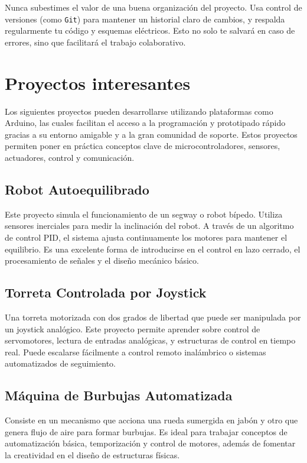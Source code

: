 \documentclass[a4paper,11pt]{article}
\begin{document}
\begin{tcolorbox}[tip,title=Consejo]
 Nunca subestimes el valor de una buena organización del proyecto. Usa control de versiones (como \texttt{Git}) para mantener un historial claro de cambios, y respalda regularmente tu código y esquemas eléctricos. Esto no solo te salvará en caso de errores, sino que facilitará el trabajo colaborativo.
\end{tcolorbox}



\section{Proyectos interesantes}
Los siguientes proyectos pueden desarrollarse utilizando plataformas como Arduino, las cuales facilitan el acceso a la programación y prototipado rápido gracias a su entorno amigable y a la gran comunidad de soporte. Estos proyectos permiten poner en práctica conceptos clave de microcontroladores, sensores, actuadores, control y comunicación.

\subsection{Robot Autoequilibrado}
Este proyecto simula el funcionamiento de un segway o robot bípedo. Utiliza sensores inerciales para medir la inclinación del robot. A través de un algoritmo de control PID, el sistema ajusta continuamente los motores para mantener el equilibrio. Es una excelente forma de introducirse en el control en lazo cerrado, el procesamiento de señales y el diseño mecánico básico.

\subsection{Torreta Controlada por Joystick}
Una torreta motorizada con dos grados de libertad que puede ser manipulada por un joystick analógico. Este proyecto permite aprender sobre control de servomotores, lectura de entradas analógicas, y estructuras de control en tiempo real. Puede escalarse fácilmente a control remoto inalámbrico o sistemas automatizados de seguimiento.

\subsection{Máquina de Burbujas Automatizada}
Consiste en un mecanismo que acciona una rueda sumergida en jabón y otro que genera flujo de aire para formar burbujas. Es ideal para trabajar conceptos de automatización básica, temporización y control de motores, además de fomentar la creatividad en el diseño de estructuras físicas.
\end{document}
